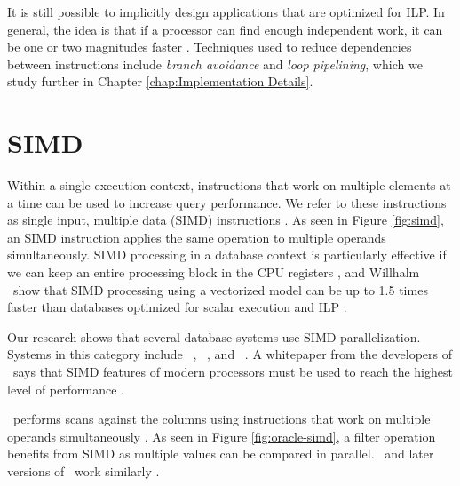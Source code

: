 It is still possible to implicitly design applications that are optimized for ILP. In general, the idea is that if a processor can find enough independent work, it can be one or two magnitudes faster \cite{Boncz2005-wj}. Techniques used to reduce dependencies between instructions include \textit{branch avoidance} and \textit{loop pipelining}, which we study further in Chapter \ref{chap:Implementation Details}.

\section{SIMD}
\label{sec:SIMD}
Within a single execution context, instructions that work on multiple elements at a time can be used to increase query performance. We refer to these instructions as single input, multiple data (SIMD) instructions \cite{Wikipedia_contributors2015-ax}. As seen in Figure \ref{fig:simd}, an SIMD instruction applies the same operation to multiple operands simultaneously. SIMD processing in a database context is particularly effective if we can keep an entire processing block in the CPU registers \cite{Neumann2011-uq}, and Willhalm \ea~show that SIMD processing using a vectorized model can be up to 1.5 times faster than databases optimized for scalar execution and ILP \cite{Willhalm2009-hu}.

Our research shows that several database systems use SIMD parallelization. Systems in this category include \oracle~\cite{Lahiri2015-mz}, \blink~\cite{Barber2012-xt}, and \ibm~\cite{Raman2013-em}. A whitepaper from the developers of \exasol~says that SIMD features of modern processors must be used to reach the highest level of performance \cite{Exasol2014-xh}.

\oracle~performs scans against the columns using instructions that work on multiple operands simultaneously \cite{Lahiri2015-mz}. As seen in Figure \ref{fig:oracle-simd}, a filter operation benefits from SIMD as multiple values can be compared in parallel. \ibm~and later versions of \blink~work similarly \cite{Barber2012-xt, Raman2013-em}.

